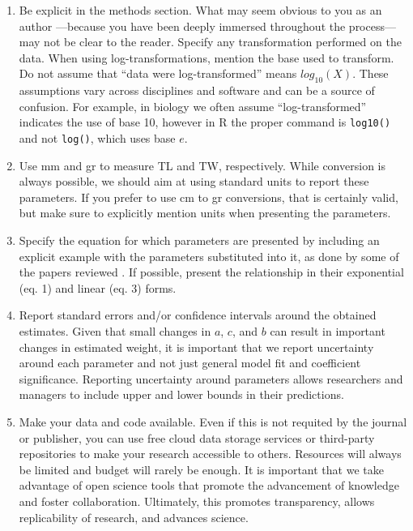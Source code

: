 \documentclass[fleqn,10pt,lineno]{wlpeerj} %
\theoremstyle{definition}
\theoremstyle{definition}
\theoremstyle{definition}
\theoremstyle{remark}
\begin{document}
\begin{enumerate}
\def\labelenumi{\arabic{enumi}.}
\item
  Be explicit in the methods section. What may seem obvious to you as an
  author ---because you have been deeply immersed throughout the
  process--- may not be clear to the reader. Specify any transformation
  performed on the data. When using log-transformations, mention the
  base used to transform. Do not assume that ``data were
  log-transformed'' means \(log_{10}(X)\). These assumptions vary across
  disciplines and software and can be a source of confusion. For
  example, in biology we often assume ``log-transformed'' indicates the
  use of base 10, however in R the proper command is \texttt{log10()}
  and not \texttt{log()}, which uses base \(e\).
\item
  Use mm and gr to measure TL and TW, respectively. While conversion is
  always possible, we should aim at using standard units to report these
  parameters. If you prefer to use cm to gr conversions, that is
  certainly valid, but make sure to explicitly mention units when
  presenting the parameters.
\item
  Specify the equation for which parameters are presented by including
  an explicit example with the parameters substituted into it, as done
  by some of the papers reviewed
  \citep{chin_2016,sandel_2015,deleon_2013,sabidoitza_2016}. If
  possible, present the relationship in their exponential (eq. 1) and
  linear (eq. 3) forms.
\item
  Report standard errors and/or confidence intervals around the obtained
  estimates. Given that small changes in \(a\), \(c\), and \(b\) can
  result in important changes in estimated weight, it is important that
  we report uncertainty around each parameter and not just general model
  fit and coefficient significance. Reporting uncertainty around
  parameters allows researchers and managers to include upper and lower
  bounds in their predictions.
\item
  Make your data and code available. Even if this is not requited by the
  journal or publisher, you can use free cloud data storage services or
  third-party repositories to make your research accessible to others.
  Resources will always be limited and budget will rarely be enough. It
  is important that we take advantage of open science tools that promote
  the advancement of knowledge and foster collaboration. Ultimately,
  this promotes transparency, allows replicability of research, and
  advances science.
\end{enumerate}
\end{document}
